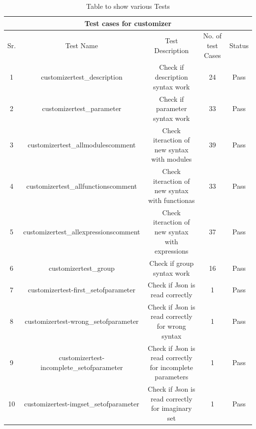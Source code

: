 \begin{table}
	\centering
	\caption{Table to show various Tests}
	 \begin{tabular}{ |c|c|c|c|c| }
			\hline
			\multicolumn{5}{|c|}{Test cases for customizer } \\
			\hline
			Sr. & Test Name & Test Description &No. of test Cases& Status \\ \hline
			1 &customizertest\_description& Check if description syntax work& 24 &Pass\\ \hline
			2 &customizertest\_parameter& Check if parameter syntax work& 33 &Pass\\ \hline
			3 &customizertest\_allmodulescomment& Check iteraction of new syntax with modules & 39 &Pass\\ \hline
			4 &customizertest\_allfunctionscomment & Check iteraction of new syntax with functionas&33 &Pass\\ \hline
			5 &customizertest\_allexpressionscomment&Check iteraction of new syntax with expressions& 37&Pass\\ \hline
			6 &customizertest\_group&  Check if group syntax work&16 & Pass\\ \hline
			7 &customizertest-first\_setofparameter& Check if Json is read correctly& 1& Pass\\ \hline
			8 &customizertest-wrong\_setofparameter&Check if Json is read correctly for wrong syntax& 1&Pass\\ \hline
			9 &customizertest-incomplete\_setofparameter& Check if Json is read correctly for incomplete parameters& 1& Pass\\ \hline
			10 &customizertest-imgset\_setofparameter&Check if Json is read correctly for imaginary set&1 & Pass\\ \hline	
		\end{tabular}
	\end{table}
		
		
